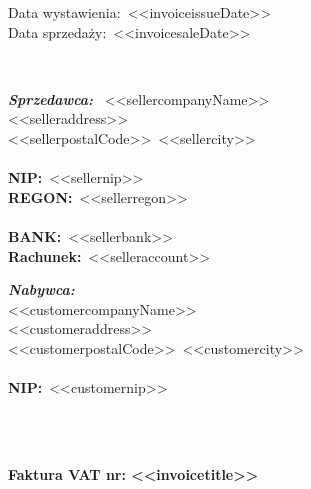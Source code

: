 \documentclass[12pt]{article}
\newcommand{\nipText}{\textbf{NIP:}}
\newcommand{\regonText}{\textbf{REGON:}}
\newcommand{\bankText}{\textbf{BANK:}}
\newcommand{\accountText}{\textbf{Rachunek:}}
\begin{document}
    \begin{footnotesize}
        \begin{flushright}
            \begin{minipage}[t]{.4\textwidth}
                Data wystawienia:~<<invoiceissueDate>> \\
                Data sprzedaży:~<<invoicesaleDate>>
            \end{minipage}
        \end{flushright}
    \end{footnotesize}

    \ \\

    \begin{small}
        \begin{minipage}[t]{.6\textwidth}
            \textbf{\emph{Sprzedawca:}} \
            <<sellercompanyName>> \\
            <<selleraddress>> \\
            <<sellerpostalCode>>~<<sellercity>> \\ \\
            \nipText~<<sellernip>> \\
            \regonText~<<sellerregon>> \\ \\
            \bankText~<<sellerbank>> \\
            \accountText~<<selleraccount>>
        \end{minipage}
        \begin{minipage}[t]{\textwidth}
            \textbf{\emph{Nabywca:}} \\
            <<customercompanyName>> \\
            <<customeraddress>> \\
            <<customerpostalCode>>~<<customercity>> \\ \\
            \nipText~<<customernip>>
        \end{minipage}
    \end{small}

    \ \\ \ \\

    \centerline{\textbf{\LARGE{Faktura VAT nr: <<invoicetitle>>}}}

    \ \\
\end{document}
